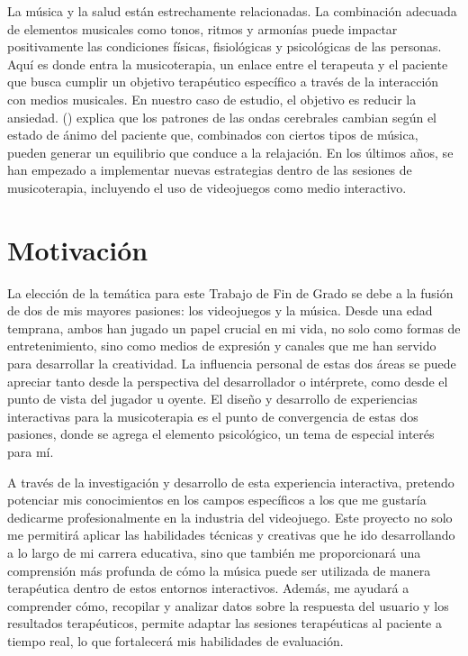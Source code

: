 La música y la salud están estrechamente relacionadas. La combinación adecuada de elementos musicales como tonos, ritmos y armonías puede impactar positivamente las condiciones físicas, fisiológicas y psicológicas de las personas. Aquí es donde entra la musicoterapia, un enlace entre el terapeuta y el paciente que busca cumplir un objetivo terapéutico específico a través de la interacción con medios musicales. En nuestro caso de estudio, el objetivo es reducir la ansiedad. \citeauthor{KTN:2011} (\citeyear{KTN:2011}) explica que los patrones de las ondas cerebrales cambian según el estado de ánimo del paciente que, combinados con ciertos tipos de música, pueden generar un equilibrio que conduce a la relajación. En los últimos años, se han empezado a implementar nuevas estrategias dentro de las sesiones de musicoterapia, incluyendo el uso de videojuegos como medio interactivo.

\section{Motivación}

La elección de la temática para este Trabajo de Fin de Grado se debe a la fusión de dos de mis mayores pasiones: los videojuegos y la música. Desde una edad temprana, ambos han jugado un papel crucial en mi vida, no solo como formas de entretenimiento, sino como medios de expresión y canales que me han servido para desarrollar la creatividad. La influencia personal de estas dos áreas se puede apreciar tanto desde la perspectiva del desarrollador o intérprete, como desde el punto de vista del jugador u oyente. El diseño y desarrollo de experiencias interactivas para la musicoterapia es el punto de convergencia de estas dos pasiones, donde se agrega el elemento psicológico, un tema de especial interés para mí. 

A través de la investigación y desarrollo de esta experiencia interactiva, pretendo potenciar mis conocimientos en los campos específicos a los que me gustaría dedicarme profesionalmente en la industria del videojuego. Este proyecto no solo me permitirá aplicar las habilidades técnicas y creativas que he ido desarrollando a lo largo de mi carrera educativa, sino que también me proporcionará una comprensión más profunda de cómo la música puede ser utilizada de manera terapéutica dentro de estos entornos interactivos. Además, me ayudará a comprender cómo, recopilar y analizar datos sobre la respuesta del usuario y los resultados terapéuticos, permite adaptar las sesiones terapéuticas al paciente a tiempo real, lo que fortalecerá mis habilidades de evaluación.

